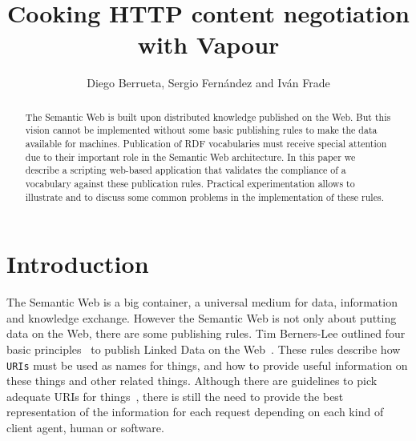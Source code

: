 \documentclass{../templates/llncs}
\begin{document}
\title{Cooking HTTP content negotiation with Vapour} %

\author{Diego Berrueta, Sergio Fern\'andez and Iv\'an Frade}


\maketitle

\begin{abstract}
The Semantic Web is built upon distributed knowledge published on 
the Web. But this vision cannot be implemented without some basic publishing
rules to make the data available for machines. Publication of RDF vocabularies
must receive special attention due to their important role 
in the Semantic Web architecture. In this paper we describe a scripting 
web-based application that validates the compliance of a vocabulary 
against these publication rules. Practical experimentation allows to 
illustrate and to discuss some common problems in the implementation
of these rules.
\end{abstract}

\section{Introduction}

The Semantic Web is a big container, a universal medium for data, information
and knowledge exchange. However the Semantic Web is not only about putting data on
the Web, there are some publishing rules. Tim Berners-Lee outlined four basic 
principles~\cite{TimBL2006} to publish Linked Data on the Web~\cite{PublishLinkedData2007}.
These rules describe how \texttt{URIs} must be used as names for things, 
and how to provide useful information on these things and other related 
things. Although there are guidelines to pick adequate URIs for 
things~\cite{Sauermann2007}, there is still the need to provide the best 
representation of the information for each request depending on each kind 
of client agent, human or software.
\end{document}
